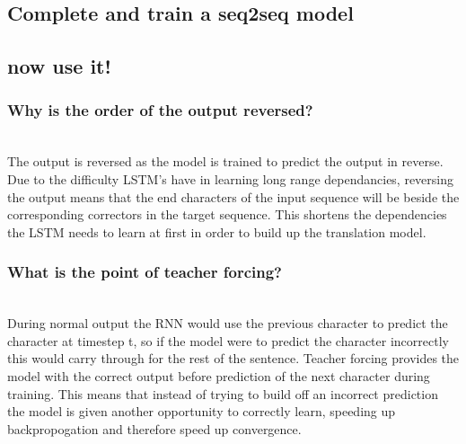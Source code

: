 \documentclass[sigconf]{acmart}
\begin{document}
\subsection{Complete and train a seq2seq model}
\subsection{now use it!}
\label{scn:1.2}
\subsubsection{Why is the order of the output reversed?}\\

The output is reversed as the model is trained to predict the output in reverse. 
Due to the difficulty LSTM's have in learning long range dependancies, reversing the output means that the end characters of the input sequence will be beside the corresponding correctors in the target sequence. This shortens the dependencies the LSTM needs to learn at first in order to build up the translation model. 
\subsubsection{What is the point of teacher forcing?}\\

During normal output the RNN would use the previous character to predict the character at timestep t, so if the model were to predict the character incorrectly this would carry through for the rest of the sentence.
Teacher forcing provides the model with the correct output before prediction of the next character during training. 
This means that instead of trying to build off an incorrect prediction the model is given another opportunity to correctly learn, speeding up backpropogation and therefore speed up convergence.
\end{document}
